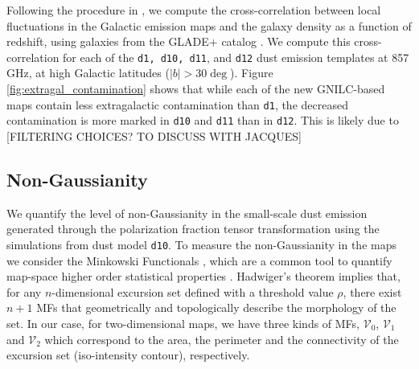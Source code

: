 \documentclass[twocolumn]{aastex631}
\begin{document}
Following the procedure in \citet{Chiang:2019}, we compute the cross-correlation between local fluctuations in the Galactic emission maps and the galaxy density as a function of redshift, using galaxies from the GLADE+ catalog \citep{Dalya:2022}. We compute this cross-correlation for each of the \texttt{d1, d10, d11}, and \texttt{d12} dust emission templates at 857 GHz, at high Galactic latitudes ($\left|b\right| > 30\deg$). Figure \ref{fig:extragal_contamination} shows that while each of the new GNILC-based maps contain less extragalactic contamination than \texttt{d1}, the decreased contamination is more marked in \texttt{d10} and \texttt{d11} than in \texttt{d12}. This is likely due to [FILTERING CHOICES? TO DISCUSS WITH JACQUES]


\subsection{Non-Gaussianity} \label{sec:nongaussianity}

We quantify the level of non-Gaussianity in the small-scale dust emission generated through the polarization fraction tensor transformation using the simulations from dust model \texttt{d10}. To measure the non-Gaussianity in the maps we consider the Minkowski Functionals \citep[MFs,][]{Minkowski1903}, which are a common tool to quantify map-space higher order statistical properties \citep{Martire:2023, Carones:2024}. 
Hadwiger’s theorem \citep{hadwigerVorlesungenUeberInhalt1957}
implies that, for any $n$-dimensional excursion set defined with a threshold value $\rho$, there exist $n+1$ MFs that geometrically and topologically describe the morphology of the set. In our case, for two-dimensional maps, we have three kinds of MFs, $\mathcal{V}_0$, $\mathcal{V}_1$ and $\mathcal{V}_2$ which correspond to the area, the perimeter and the connectivity of the excursion set (iso-intensity contour), respectively.
\end{document}
